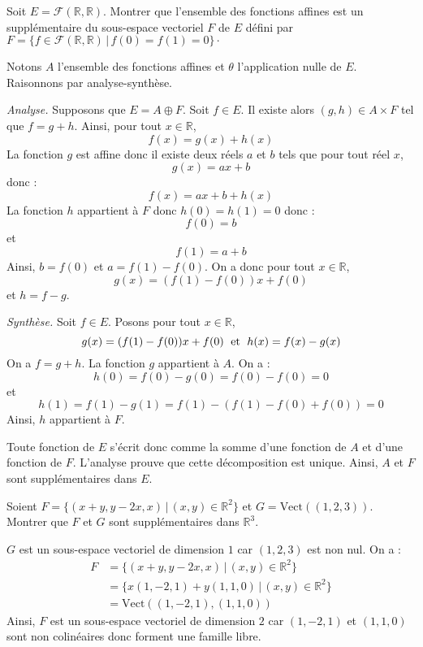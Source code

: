 \documentclass[a4paper,10pt]{report}
\begin{document}
\begin{Exercice}{} Soit $E = \mathcal{F}(\mathbb{R}, \mathbb{R})$. Montrer que l'ensemble des fonctions affines est un supplémentaire du sous-espace vectoriel $F$ de $E$ défini par $F = \lbrace f \in \mathcal{F}(\mathbb{R}, \mathbb{R}) \, \vert \, f(0)=f(1)=0 \rbrace\cdot$
\end{Exercice}

\corr Notons $A$ l'ensemble des fonctions affines et $\theta$ l'application nulle de $E$. Raisonnons par analyse-synthèse.

\medskip

\noindent \textit{Analyse.} Supposons que $E = A \oplus F$. Soit $f \in E$. Il existe alors $(g,h) \in A \times F$ tel que $f=g+h$. Ainsi, pour tout $x \in \mathbb{R}$,
$$ f(x) =g(x)+h(x)$$
La fonction $g$ est affine donc il existe deux réels $a$ et $b$ tels que pour tout réel $x$,
$$ g(x) = ax+b$$
donc :
$$ f(x) = ax+b + h(x)$$
La fonction $h$ appartient à $F$ donc $h(0)=h(1)=0$ donc :
$$ f(0) = b$$
et 
$$ f(1) = a+b$$
Ainsi, $b=f(0)$ et $a=f(1)-f(0)$. On a donc pour tout $x \in \mathbb{R}$,
$$ g(x) = (f(1)-f(0))x + f(0)$$
et $h=f-g$.

\medskip

\noindent \textit{Synthèse.} Soit $f \in E$. Posons pour tout $x \in \mathbb{R}$,
$$ g(x) = (f(1)-f(0))x + f(0) \; \hbox{ et } \; h(x)=f(x)-g(x)$$
On a $f=g+h$. La fonction $g$ appartient à $A$. On a :
$$ h(0) = f(0)-g(0) = f(0)-f(0)=0$$
et
$$ h(1) = f(1)-g(1) = f(1)- (f(1)-f(0)+f(0))= 0$$
Ainsi, $h$ appartient à $F$.

\medskip

\noindent Toute fonction de $E$ s'écrit donc comme la somme d'une fonction de $A$ et d'une fonction de $F$. L'analyse prouve que cette décomposition est unique. Ainsi, $A$ et $F$ sont supplémentaires dans $E$.

\begin{Exercice}{} Soient $F= \lbrace (x+y,y-2x, x) \, \vert \,  (x,y) \in \mathbb{R}^2 \rbrace$ et $G = \textrm{Vect}((1,2,3))$. Montrer que $F$ et $G$ sont supplémentaires dans $\mathbb{R}^3$.
\end{Exercice} 

\corr $G$ est un sous-espace vectoriel de dimension $1$ car $(1,2,3)$ est non nul. On a :
\begin{align*}
F & = \lbrace (x+y,y-2x, x) \, \vert \,  (x,y) \in \mathbb{R}^2 \rbrace \\
& = \lbrace x (1,-2,1) + y (1,1,0) \, \vert \, (x,y) \in \mathbb{R}^2 \rbrace \\
& = \textrm{Vect}((1,-2,1),(1,1,0)) 
\end{align*}
Ainsi, $F$ est un sous-espace vectoriel de dimension $2$ car $(1,-2,1)$ et $(1,1,0)$ sont non colinéaires donc forment une famille libre.
\end{document}
